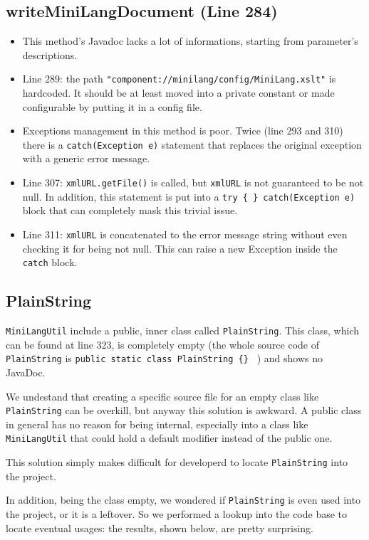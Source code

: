 \documentclass[11pt]{article} %
\begin{document}
\subsection{writeMiniLangDocument (Line 284)}
\begin{itemize}
	\item This method's Javadoc lacks a lot of informations, starting from parameter's descriptions.
	\item Line 289: the path \texttt{"component://minilang/config/MiniLang.xslt"} is hardcoded. It should be at least moved into a private constant or made configurable by putting it in a config file.
	\item Exceptions management in this method is poor. Twice (line 293 and 310) there is a \texttt{catch(Exception e)} statement that replaces the original exception with a generic error message.
	\item Line 307: \texttt{xmlURL.getFile()} is called, but \texttt{xmlURL} is not guaranteed to be not null. In addition, this statement is put into a \texttt{try \{ \} catch(Exception e)} block that can completely mask this trivial issue.
	\item Line 311: \texttt{xmlURL} is concatenated to the error message string without even checking it for being not null. This can raise a new Exception inside the \texttt{catch} block.
\end{itemize}

\subsection{PlainString}

\texttt{MiniLangUtil} include a public, inner class called \texttt{PlainString}. This class, which can be found at line 323, is completely empty (the whole source code of \texttt{PlainString} is \texttt{public static class PlainString \{\} }  ) and shows no JavaDoc.

We undestand that creating a specific source file for an empty class like \texttt{PlainString} can be overkill, but anyway this solution is awkward. A public class in general has no reason for being internal, especially into a class like \texttt{MiniLangUtil} that could hold a default modifier instead of the public one.

This solution simply makes difficult for developerd to locate \texttt{PlainString} into the project. 

In addition, being the class empty, we wondered if \texttt{PlainString} is even used into the project, or it is a leftover. So we performed a lookup into the code base to locate eventual usages: the results, shown below, are pretty surprising.
\end{document}

